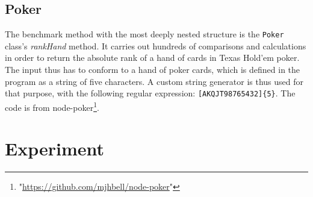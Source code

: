 \subsection{Poker}
The benchmark method with the most deeply nested structure is the \texttt{Poker} class's \emph{rankHand} method. It carries out hundreds of comparisons and calculations in order to return the absolute rank of a hand of cards in Texas Hold'em poker. The input thus has to conform to a hand of poker cards, which is defined in the program as a string of five characters. A custom string generator is thus used for that purpose, with the following regular expression: \texttt{[AKQJT98765432]\{5\}}. The code is from \textsf{node-poker}\footnote{"\url{https://github.com/mjhbell/node-poker}"}.

\section{Experiment}

